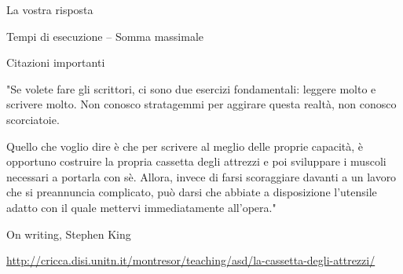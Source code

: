 \begin{frame}{La vostra risposta}
	
	
\end{frame}


\begin{frame}{Tempi di esecuzione -- Somma massimale}
    

\end{frame}

\begin{frame}{Citazioni importanti}

\begin{mdframed}[style=mybox]
\small
"Se volete fare gli scrittori, ci sono due esercizi fondamentali: leggere molto
e scrivere molto. Non conosco stratagemmi per aggirare questa realtà, non
conosco scorciatoie. 

\bigskip
[...]

\bigskip
Quello che voglio dire è che per scrivere al meglio delle proprie capacità, è 
opportuno costruire la propria cassetta degli attrezzi e poi sviluppare i
muscoli necessari a portarla con sè. Allora, invece di farsi scoraggiare
davanti a un lavoro che si preannuncia complicato, può darsi che abbiate a
disposizione l'utensile adatto con il quale mettervi immediatamente all'opera."
\end{mdframed}

\begin{flushright}
On writing, Stephen King
\end{flushright}

\bigskip
{\tiny
\url{http://cricca.disi.unitn.it/montresor/teaching/asd/la-cassetta-degli-attrezzi/}
}

\end{frame}

